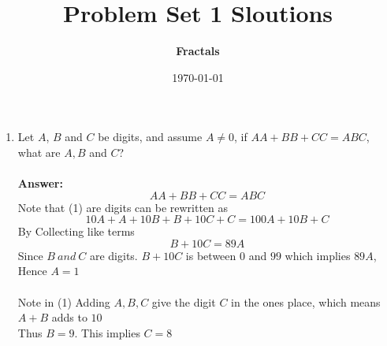 \documentclass[a4paper]{article}
\begin{document}
\author{\textbf{Fractals}}
\title{\textbf{Problem Set 1 Sloutions}}
\date {\today}
\maketitle
\noindent
\begin{enumerate}
    \item Let $A$, $B$ and $C$ be digits, and assume $A\neq 0$, 
        if $AA + BB + CC = ABC$, what are $A, B$ and $C$?
        \\ \\
        \textbf{Answer:}
        \begin{equation}
            AA + BB + CC = ABC
        \end{equation}
        Note that (1) are digits can be rewritten as 
        $$ 10A + A + 10B + B + 10C + C = 100A+10B+C$$ By Collecting like terms
        $$ B + 10 C = 89 A$$ Since $B \ and \ C$ are digits. $B + 10 C$ is between $0$ and $99$
        which implies $89A$, Hence $A=1$ \\ \\ 
        Note in (1) Adding $A,B,C$ give the digit $C$ in the ones place, which means $A+B$ adds to $10$ \\
        Thus $B=9$. This implies $C=8$


\end{enumerate}
\end{document}
